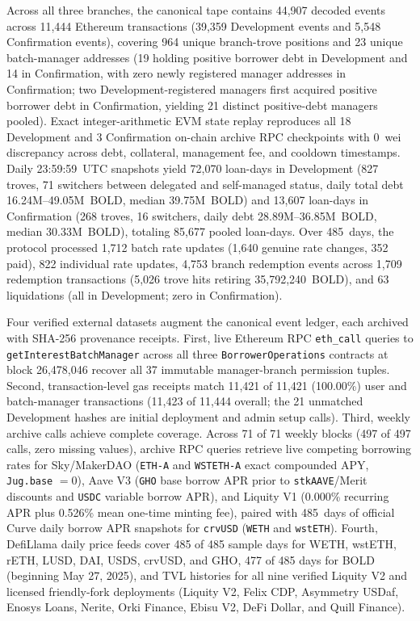 Across all three branches, the canonical tape contains 44,907 decoded events across 11,444 Ethereum transactions (39,359 Development events and 5,548 Confirmation events), covering 964 unique branch-trove positions and 23 unique batch-manager addresses (19 holding positive borrower debt in Development and 14 in Confirmation, with zero newly registered manager addresses in Confirmation; two Development-registered managers first acquired positive borrower debt in Confirmation, yielding 21 distinct positive-debt managers pooled). Exact integer-arithmetic EVM state replay reproduces all 18 Development and 3 Confirmation on-chain archive RPC checkpoints with 0~wei discrepancy across debt, collateral, management fee, and cooldown timestamps. Daily 23:59:59~UTC snapshots yield 72,070 loan-days in Development (827 troves, 71 switchers between delegated and self-managed status, daily total debt 16.24M--49.05M~BOLD, median 39.75M~BOLD) and 13,607 loan-days in Confirmation (268 troves, 16 switchers, daily debt 28.89M--36.85M~BOLD, median 30.33M~BOLD), totaling 85,677 pooled loan-days. Over 485~days, the protocol processed 1,712 batch rate updates (1,640 genuine rate changes, 352 paid), 822 individual rate updates, 4,753 branch redemption events across 1,709 redemption transactions (5,026 trove hits retiring 35,792,240~BOLD), and 63 liquidations (all in Development; zero in Confirmation).

Four verified external datasets augment the canonical event ledger, each archived with SHA-256 provenance receipts. First, live Ethereum RPC \texttt{eth\_call} queries to \texttt{getInterestBatchManager} across all three \texttt{BorrowerOperations} contracts at block 26,478,046 recover all 37 immutable manager-branch permission tuples. Second, transaction-level gas receipts match 11,421 of 11,421 (100.00\%) user and batch-manager transactions (11,423 of 11,444 overall; the 21 unmatched Development hashes are initial deployment and admin setup calls). Third, weekly archive calls achieve complete coverage. Across 71 of 71 weekly blocks (497 of 497 calls, zero missing values), archive RPC queries retrieve live competing borrowing rates for Sky/MakerDAO (\texttt{ETH-A} and \texttt{WSTETH-A} exact compounded APY, \texttt{Jug.base} $= 0$), Aave V3 (\texttt{GHO} base borrow APR prior to \texttt{stkAAVE}/Merit discounts and \texttt{USDC} variable borrow APR), and Liquity V1 (0.000\% recurring APR plus 0.526\% mean one-time minting fee), paired with 485~days of official Curve daily borrow APR snapshots for \texttt{crvUSD} (\texttt{WETH} and \texttt{wstETH}). Fourth, DefiLlama daily price feeds cover 485 of 485 sample days for WETH, wstETH, rETH, LUSD, DAI, USDS, crvUSD, and GHO, 477 of 485 days for BOLD (beginning May 27, 2025), and TVL histories for all nine verified Liquity V2 and licensed friendly-fork deployments (Liquity V2, Felix CDP, Asymmetry USDaf, Enosys Loans, Nerite, Orki Finance, Ebisu V2, DeFi Dollar, and Quill Finance).

